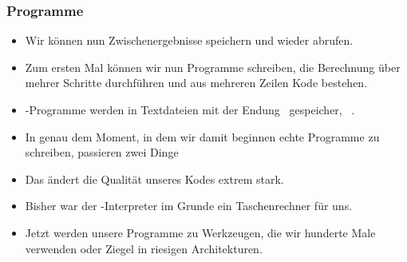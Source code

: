 \documentclass[aspectratio=169,mathserif,notheorems]{beamer}%
\begin{document}
\begin{frame}%
\frametitle{Programme}%
\begin{itemize}%
\item Wir können nun Zwischenergebnisse speichern und wieder abrufen.
\item<2-> Zum ersten Mal können wir nun Programme schreiben, die Berechnung über mehrer Schritte durchführen und aus mehreren Zeilen Kode bestehen.%
\item<3-> \python-Programme werden in Textdateien mit der Endung~ gespeicher, \DEzB~.%
\item<4-> In genau dem Moment, in dem wir damit beginnen echte Programme zu schreiben, passieren zwei Dinge%
%
\item<9-> Das ändert die Qualität unseres Kodes extrem stark.%
\item<10-> Bisher war der \python-Interpreter im Grunde ein Taschenrechner für uns.%
\item<11-> Jetzt werden unsere Programme zu Werkzeugen, die wir hunderte Male verwenden oder Ziegel in riesigen Architekturen.%
\end{itemize}%
\end{frame}%
%
\end{document}
